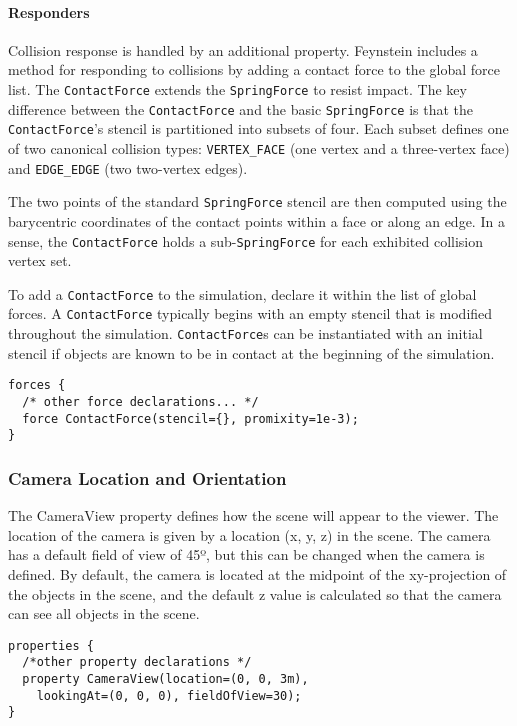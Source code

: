 \documentclass[letterpaper]{article}
\newcommand\subsubsubsection[1]{\paragraph{#1}}
\begin{document}
\subsubsubsection{Responders}

Collision response is handled by an additional property. Feynstein
includes a method for responding to collisions by adding a contact
force to the global force list. The \texttt{ContactForce} extends the
\texttt{SpringForce} to resist impact. The key difference between the
\texttt{ContactForce} and the basic \texttt{SpringForce} is that the
\texttt{ContactForce}'s stencil is partitioned into subsets of four. Each
subset defines one of two canonical collision types: \texttt{VERTEX\_FACE}
(one vertex and a three-vertex face) and \texttt{EDGE\_EDGE} (two two-vertex
edges).

The two points of the standard \texttt{SpringForce} stencil are then computed
using the barycentric coordinates of the contact points within a face
or along an edge. In a sense, the \texttt{ContactForce} holds a
sub-\texttt{SpringForce} for each exhibited collision vertex set.

To add a \texttt{ContactForce} to the simulation, declare it within the list of
global forces. A \texttt{ContactForce} typically begins with an empty stencil
that is modified throughout the simulation. \texttt{ContactForce}s can be
instantiated with an initial stencil if objects are known to be in
contact at the beginning of the simulation.

\begin{verbatim}
forces {
  /* other force declarations... */
  force ContactForce(stencil={}, promixity=1e-3);
}
\end{verbatim}

\subsubsection{Camera Location and Orientation}

The CameraView property defines how the scene will appear to the
viewer. The location of the camera is given by a location (x, y, z) in
the scene. The camera has a default field of view of 45º, but this can
be changed when the camera is defined. By default, the camera is
located at the midpoint of the xy-projection of the objects in the
scene, and the default z value is calculated so that the camera can
see all objects in the scene.

\begin{verbatim}
properties {
  /*other property declarations */
  property CameraView(location=(0, 0, 3m), 
    lookingAt=(0, 0, 0), fieldOfView=30);
}
\end{verbatim}
\end{document}
